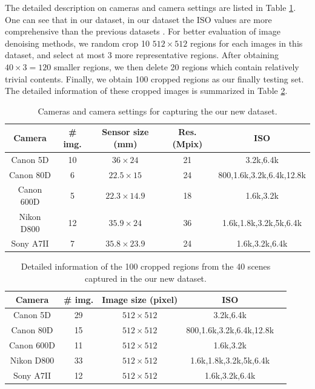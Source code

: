 The detailed description on cameras and camera settings are listed in Table \ref{tab6-4}. One can see that in our dataset, in our dataset the ISO values are more comprehensive than the previous datasets \cite{RENOIR2014,crosschannel2016,dnd2017}. For better evaluation of image denoising methods, we random crop 10 $512\times512$ regions for each images in this dataset, and select at most 3 more representative regions. After obtaining $40\times3=120$ smaller regions, we then delete 20 regions which contain relatively trivial contents. Finally, we obtain 100 cropped regions as our finally testing set. The detailed information of these cropped images is summarized in Table \ref{tab6-5}.

\begin{table}[ht!]
\caption{Cameras and camera settings for capturing the our new dataset.}
\vspace{-5mm}
\label{tab6-4}
\begin{center}
\small
\renewcommand\arraystretch{1.2}
\begin{tabular*}{1\textwidth}{@{\extracolsep{\fill}}ccccc}
\hline
Camera
&
\# img.
&
Sensor size (mm)
&
Res. (Mpix)
&
ISO
\\
\hline
Canon 5D & 10  & $36\times24$  & 21  & 3.2k,6.4k
\\
\hline
Canon 80D & 6  & $22.5\times15$  & 24 & 800,1.6k,3.2k,6.4k,12.8k 
\\
\hline   
Canon 600D & 5 & $22.3\times14.9$  & 18  & 1.6k,3.2k 
\\
\hline   
Nikon D800 & 12 & $35.9\times24$  & 36 & 1.6k,1.8k,3.2k,5k,6.4k 
\\
\hline   
Sony A7II & 7 & $35.8\times23.9$  & 24  & 1.6k,3.2k,6.4k 
\\
\hline
\end{tabular*}
\end{center}
\end{table}

\begin{table}[ht!]
\caption{Detailed information of the 100 cropped regions from the 40 scenes captured in the our new dataset.}
\vspace{-5mm}
\label{tab6-5}
\begin{center}
\small
\renewcommand\arraystretch{1.2}
\begin{tabular*}{1\textwidth}{@{\extracolsep{\fill}}ccccc}
\hline
Camera
&
\# img.
&
Image size (pixel)
&
ISO
\\
\hline
Canon 5D & 29 & $512\times512$ & 3.2k,6.4k
\\
\hline
Canon 80D & 15 & $512\times512$ & 800,1.6k,3.2k,6.4k,12.8k 
\\
\hline   
Canon 600D & 11 & $512\times512$ & 1.6k,3.2k 
\\
\hline   
Nikon D800 & 33 & $512\times512$ & 1.6k,1.8k,3.2k,5k,6.4k 
\\
\hline   
Sony A7II & 12 & $512\times512$ & 1.6k,3.2k,6.4k 
\\
\hline
\end{tabular*}
\end{center}
\end{table}


